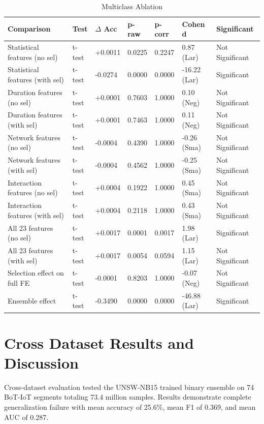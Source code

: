 \documentclass[pdflatex,sn-mathphys-num]{sn-jnl}
\theoremstyle{thmstyleone}%
\theoremstyle{thmstyletwo}%
\theoremstyle{thmstylethree}%
\begin{document}
\begin{table}[htbp]
\centering
\small
\caption{Multiclass Ablation}
\label{MulticlassAblation}
\renewcommand{\arraystretch}{1.0}
\setlength{\tabcolsep}{4pt}
\begin{tabular}{@{}p{3.7cm}p{0.7cm}p{1cm}p{1cm}p{1cm}p{1.6cm}p{2.1cm}@{}}
\toprule
\textbf{Comparison} 
& \textbf{Test} 
& \textbf{$\Delta$ Acc}
& \textbf{p-raw} 
& \textbf{p-corr} 
& \textbf{Cohen d}
& \textbf{Significant}\\
\midrule
Statistical features (no sel)       & t-test & +0.0011 & 0.0225 & 0.2247 & 0.87 (Lar)   &  Not Significant \\
Statistical features (with sel)     & t-test & -0.0274 & 0.0000 & 0.0000 & -16.22 (Lar) & Significant      \\
Duration features (no sel)          & t-test & +0.0001 & 0.7603 & 1.0000 & 0.10 (Neg)   &  Not Significant \\
Duration features (with sel)        & t-test & +0.0001 & 0.7463 & 1.0000 & 0.11 (Neg)   &  Not Significant \\
Network features (no sel)           & t-test & -0.0004 & 0.4390 & 1.0000 & -0.26 (Sma)  &  Not Significant \\
Network features (with sel)         & t-test & -0.0004 & 0.4562 & 1.0000 & -0.25 (Sma)  &  Not Significant \\
Interaction features (no sel)       & t-test & +0.0004 & 0.1922 & 1.0000 & 0.45 (Sma)   &  Not Significant \\
Interaction features (with sel)     & t-test & +0.0004 & 0.2118 & 1.0000 & 0.43 (Sma)   &  Not Significant \\
All 23 features (no sel)            & t-test & +0.0017 & 0.0001 & 0.0017 & 1.98 (Lar)   & Significant      \\
All 23 features (with sel)          & t-test & +0.0017 & 0.0054 & 0.0594 & 1.15 (Lar)   &  Not Significant \\
Selection effect on full FE         & t-test & -0.0001 & 0.8203 & 1.0000 & -0.07 (Neg)  &  Not Significant \\
Ensemble effect                     & t-test & -0.3490 & 0.0000 & 0.0000 & -46.88 (Lar) & Significant      \\

\bottomrule
\end{tabular}
\end{table}

\section{Cross Dataset Results and Discussion}
Cross-dataset evaluation tested the UNSW-NB15 trained binary ensemble on 74 BoT-IoT segments totaling 73.4 million samples. Results demonstrate complete generalization failure with mean accuracy of 25.6\%, mean F1 of 0.369, and mean AUC of 0.287.
\end{document}
